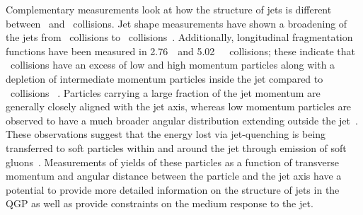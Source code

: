 Complementary measurements look at how the structure of jets is different between \pbpb\ and \pp\
collisions.
Jet shape measurements have shown 
a broadening of the jets from \pp\ collisions to \pbpb\ collisions~\cite{Chatrchyan:2013kwa,Acharya:2018uvf}.
Additionally, longitudinal fragmentation functions have been measured in 2.76~\TeV\ and 5.02~\TeV\ \pbpb\
collisions;
these indicate that \pbpb\ collisions have an excess of low and high momentum particles along with a depletion of intermediate momentum particles inside the jet compared to \pp\ collisions~\cite{Aad:2014wha,Chatrchyan:2014ava,Aaboud:2017bzv,Aaboud:2018hpb} . Particles carrying a large fraction of the jet momentum are generally closely
aligned with the jet axis, whereas low momentum particles are observed to have a much broader
angular distribution extending outside the 
jet~\cite{Chatrchyan:2011sx,Khachatryan:2015lha,Khachatryan:2016tfj,Sirunyan:2018jqr}. 
These observations suggest that the energy lost via jet-quenching is being transferred to soft particles within and around the 
jet through emission of soft 
gluons~\cite{Vitev:2008rz,Ovanesyan:2011xy,Blaizot:2014ula,Qin:2015srf,Escobedo:2016jbm,Casalderrey-Solana:2016jvj,Tachibana:2017syd}. 
Measurements of yields of these particles as a function of transverse momentum and
angular distance between the particle and the jet axis have a potential to provide more detailed information
on the structure of jets in the QGP as well as provide constraints on the medium response to the jet. 


